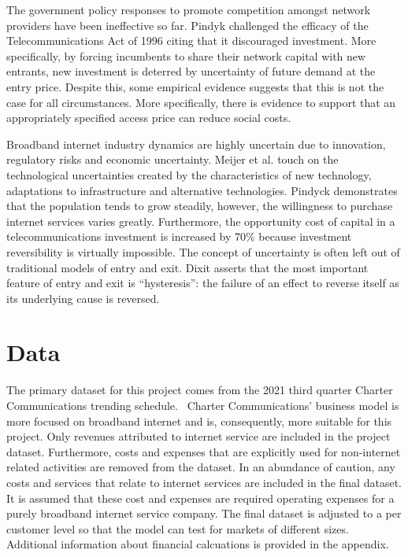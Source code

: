 \documentclass[a4paper,oneside]{article}
\begin{document}
The government policy responses to promote competition amongst network providers have been ineffective so far. 
Pindyk challenged the efficacy of the Telecommunications Act of 1996 citing that it discouraged investment. 
More specifically, by forcing incumbents to share their network capital with new entrants, new investment is deterred by uncertainty of future demand at the entry price. 
Despite this, some empirical evidence suggests that this is not the case for all circumstances. 
More specifically, there is evidence to support that an appropriately specified access price can reduce social costs.

Broadband internet industry dynamics are highly uncertain due to innovation, regulatory risks and economic uncertainty. 
Meijer et al. touch on the technological uncertainties created by the characteristics of new technology, adaptations to infrastructure and alternative technologies. 
Pindyck demonstrates that the population tends to grow steadily, however, the willingness to purchase internet services varies greatly. 
Furthermore, the opportunity cost of capital in a telecommunications investment is increased by 70\% because investment reversibility is virtually impossible.
The concept of uncertainty is often left out of traditional models of entry and exit. Dixit asserts that the most important feature of entry and exit is “hysteresis”: the failure of an effect to reverse itself as its underlying cause is reversed. 

\section{Data}

\:\:\:\:\:\: The primary dataset for this project comes from the 2021 third quarter Charter Communications trending schedule.~\citep{chtr_rep} 
Charter Communications' business model is more focused on broadband internet and is, consequently, more suitable for this project.
Only revenues attributed to internet service are included in the project dataset. 
Furthermore, costs and expenses that are explicitly used for non-internet related activities are removed from the dataset.
In an abundance of caution, any costs and services that relate to internet services are included in the final dataset. 
It is assumed that these cost and expenses are required operating expenses for a purely broadband internet service company.
The final dataset is adjusted to a per customer level so that the model can test for markets of different sizes.
Additional information about financial calcuations is provided in the appendix.
\end{document}
